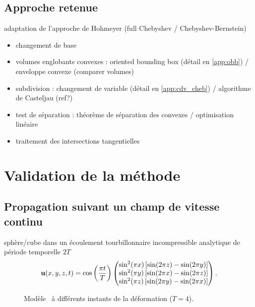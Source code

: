 \subsection{Approche retenue}
\label{sec:calcul_intersections}
adaptation de l'approche de Hohmeyer \cite{hohmeyer1992} (full Chebyshev / Chebyshev-Bernstein)
\begin{itemize}
	\item changement de base \cite{rababah2003}
	\item volumes englobants convexes : oriented bounding box \cite{fournier1994} (détail en \autoref{app:obb}) / enveloppe convexe (comparer volumes)
	\item subdivision : changement de variable (détail en \autoref{app:cdv_cheb}) / algorithme de Casteljau (ref?) 
	\item test de séparation : théorème de séparation des convexes \cite{eberly2002} / optimisation linéaire \cite{seidel1991}
	\item traitement des intersections tangentielles
\end{itemize}



\section{Validation de la méthode}

\subsection{Propagation suivant un champ de vitesse continu}
sphère/cube dans un écoulement tourbillonnaire incompressible analytique de période temporelle $2T$\\
\begin{equation}
	\mathbf{u}(x,y,z,t) = \cos \left( \frac{\pi t}{T} \right)
	\begin{pmatrix} 
	\sin^2(\pi x) \left[ \sin(2\pi z) - \sin(2\pi y)\right] \\
\sin^2(\pi y) \left[ \sin(2\pi x) - \sin(2\pi z)\right] \\
\sin^2(\pi z) \left[ \sin(2\pi y) - \sin(2\pi x)\right]
	 \end{pmatrix}.
\end{equation}
%	

\begin{figure}
	\centering
	
	\caption{Modèle \brep\ à différents instants de la déformation ($T=4$).}
	\label{fig:snapshots_vortex}
\end{figure}

